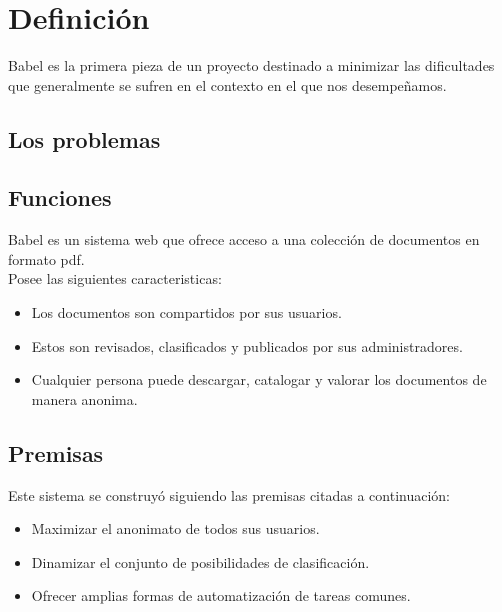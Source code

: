 \documentclass[11pt]{beamer}
\begin{document}
\section{Definición}
\begin{frame}
Babel es la primera pieza de un proyecto destinado a minimizar las dificultades
que generalmente se sufren en el contexto en el que nos desempeñamos.
\end{frame}

\subsection{Los problemas}
\begin{frame}
\begin{center}
\end{center}
\end{frame}

\subsection{Funciones}
\begin{frame}
Babel es un sistema web que ofrece acceso a una colección de documentos en formato pdf.\\ \pause
Posee las siguientes caracteristicas: \pause
\begin{itemize}
\item Los documentos son compartidos por sus usuarios. \pause
\item Estos son revisados, clasificados y publicados por sus administradores. \pause
\item Cualquier persona puede descargar, catalogar y valorar los documentos de manera anonima.
\end{itemize}
\end{frame}

\subsection{Premisas}
\begin{frame}
Este sistema se construyó siguiendo las premisas citadas a continuación:\\ \pause
\begin{itemize}
\item Maximizar el anonimato de todos sus usuarios. \pause
\item Dinamizar el conjunto de posibilidades de clasificación. \pause
\item Ofrecer amplias formas de automatización de tareas comunes.
\end{itemize}
\end{frame}
\end{document}
